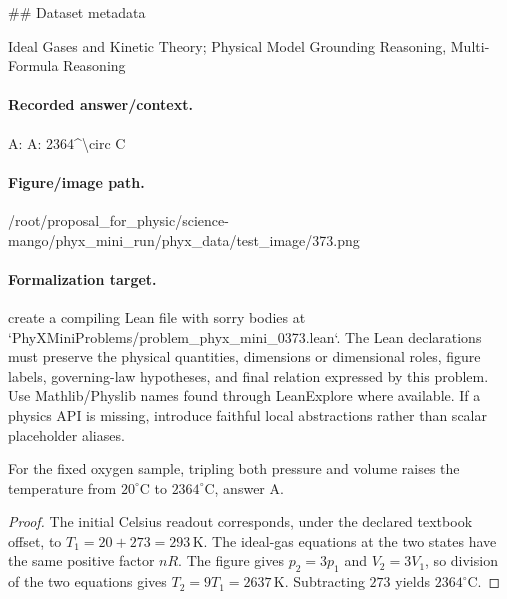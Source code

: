 \#\# Dataset metadata

Ideal Gases and Kinetic Theory; Physical Model Grounding Reasoning, Multi-Formula Reasoning

\paragraph{Recorded answer/context.}
A: A: 2364\textasciicircum{}\textbackslash{}circ C

\paragraph{Figure/image path.}
/root/proposal\_for\_physic/science-mango/phyx\_mini\_run/phyx\_data/test\_image/373.png

\paragraph{Formalization target.}
create a compiling Lean file with sorry bodies at `PhyXMiniProblems/problem\_phyx\_mini\_0373.lean`. The Lean declarations must preserve the physical quantities, dimensions or dimensional roles, figure labels, governing-law hypotheses, and final relation expressed by this problem.
Use Mathlib/Physlib names found through LeanExplore where available. If a physics API is missing, introduce faithful local abstractions rather than scalar placeholder aliases.

\begin{theorem}
\label{thm:physics:phyx_mini_0373:target}
For the fixed oxygen sample, tripling both pressure and volume raises the
temperature from \(20^\circ\mathrm C\) to \(2364^\circ\mathrm C\), answer A.
\end{theorem}
\begin{proof}
The initial Celsius readout corresponds, under the declared textbook offset,
to \(T_1=20+273=293\,\mathrm K\).  The ideal-gas equations at the two states
have the same positive factor \(nR\).  The figure gives
\(p_2=3p_1\) and \(V_2=3V_1\), so division of the two equations gives
\(T_2=9T_1=2637\,\mathrm K\).  Subtracting \(273\) yields
\(2364^\circ\mathrm C\).
\end{proof}


